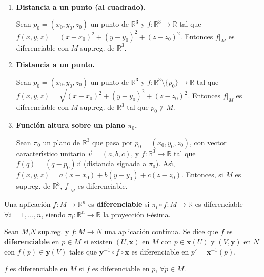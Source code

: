 \documentclass[twoside]{report}
\begin{document}
\begin{ej}

\

\begin{enumerate}
\item \textbf{Distancia a un punto (al cuadrado).}


Sean $p_0=(x_0,y_0,z_0)$ un punto de $\mathbb{R}^3$ y $f: \mathbb{R}^3 \rightarrow \mathbb{R}$ tal que $f(x,y,z)=(x-x_0)^2+(y-y_0)^2+(z-z_0)
^2$. Entonces $f\vert_M$ es diferenciable con $M$ sup.reg. de $\mathbb{R}^3$.

\item \textbf{Distancia a un punto. }

Sean $p_0=(x_0,y_0,z_0)$ un punto de $\mathbb{R}^3$
y $f: \mathbb{R}^3 \setminus\lbrace p_0\rbrace \rightarrow \mathbb{R}$ tal que $f(x,y,z)=\sqrt{(x-x_0)^2+(y-y_0)^2+(z-z_0)
^2}$. Entonces  $f\vert_M$ es diferenciable con $M$ sup.reg. de $\mathbb{R}^3$ tal que $p_0 \notin M$.

\item \textbf{Funci\'on altura sobre un plano  $\pi_0$.}

Sean $\pi_0$ un plano de $\mathbb{R}^3$ que pasa por $p_0=(x_0,y_0,z_0)$, con vector caracter\'{\i}stico unitario $\overrightarrow{v}=(a,b,c)$, y $f: \mathbb{R}^3 \rightarrow \mathbb{R}$ tal que $f(q)=(q-p_0)\overrightarrow{v}$ (distancia signada a $\pi_0$). As\'{\i}, $f(x,y,z)=a(x-x_0)+b(y-y_0)+c(z-z_0)$. Entonces, si $M$ es sup.reg. de $\mathbb{R}^3$, $f\vert_M$ es diferenciable.
\end{enumerate}
\end{ej}

\begin{defi}
Una aplicaci\'on $f: M \rightarrow \mathbb{R}^n$ es \textbf{diferenciable} si $\pi_i \circ f: M \rightarrow \mathbb{R}$ es diferenciable $\forall i =1,...,n$, siendo $\pi_i : \mathbb{R}^n \rightarrow \mathbb{R}$ la proyecci\'on i-\'esima.
\end{defi}

\begin{defi}
Sean $M$,$N$ sup.reg. y $f: M\rightarrow N$ una aplicaci\'on continua. Se dice que $f$ es \textbf{diferenciable} en $p\in M$  si existen $(U,\textbf{x})$ en $M$ con $p \in \textbf{x}(U)$ y $(V,\textbf{y})$ en $N$ con $f(p) \in \textbf{y}(V)$ tales que $\textbf{y}^{-1}\circ f \circ \textbf{x}$ es diferenciable en $p' = \textbf{x}^{-1}(p)$.
\end{defi}

\begin{nota}
$f$ es diferenciable en $M$ si $f$ es diferenciable en $p$, $\forall p \in M$.
\end{nota}
\end{document}
